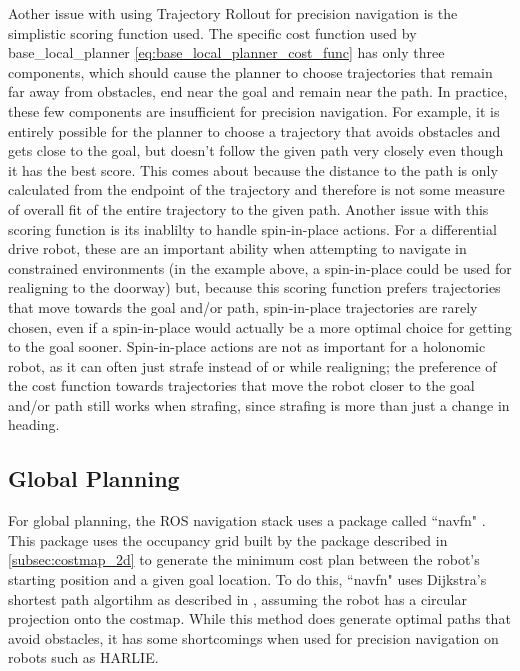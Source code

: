 Aother issue with using Trajectory Rollout for precision navigation is the simplistic scoring function used. The specific cost function used by base\_local\_planner \eqref{eq:base_local_planner_cost_func} has only three components, which should cause the planner to choose trajectories that remain far away from obstacles, end near the goal and remain near the path. In practice, these few components are insufficient for precision navigation. For example, it is entirely possible for the planner to choose a trajectory that avoids obstacles and gets close to the goal, but doesn't follow the given path very closely even though it has the best score. This comes about because the distance to the path is only calculated from the endpoint of the trajectory and therefore is not some measure of overall fit of the entire trajectory to the given path. Another issue with this scoring function is its inablilty to handle spin-in-place actions. For a differential drive robot, these are an important ability when attempting to navigate in constrained environments (in the example above, a spin-in-place could be used for realigning to the doorway) but, because this scoring function prefers trajectories that move towards the goal and/or path, spin-in-place trajectories are rarely chosen, even if a spin-in-place would actually be a more optimal choice for getting to the goal sooner. Spin-in-place actions are not as important for a holonomic robot, as it can often just strafe instead of or while realigning; the preference of the cost function towards trajectories that move the robot closer to the goal and/or path still works when strafing, since strafing is more than just a change in heading.

\subsection{Global Planning}\label{subsec:navfn}

For global planning, the ROS navigation stack uses a package called ``navfn" . This package uses the occupancy grid built by the package described in \autoref{subsec:costmap_2d} to generate the minimum cost plan between the robot's starting position and a given goal location. To do this, ``navfn" uses Dijkstra's shortest path algortihm as described in \autocite{Lav06}, assuming the robot has a circular projection onto the costmap. While this method does generate optimal paths that avoid obstacles, it has some shortcomings when used for precision navigation on robots such as HARLIE.

